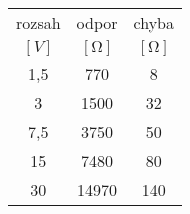 \begin{tabular}{ccc}                                           \toprule
rozsah      &  odpor           &   chyba                   \\  
$[\si{V}]$  &  $[\si{\ohm}]$   &   $[\si{\ohm}]$           \\  \midrule
1,5         &    770           &   8                       \\
3           &   1500           &   32                      \\
7,5         &   3750           &   50                      \\
15          &   7480           &   80                      \\
30          &  14970           &   140                     \\  \bottomrule
\end{tabular}




